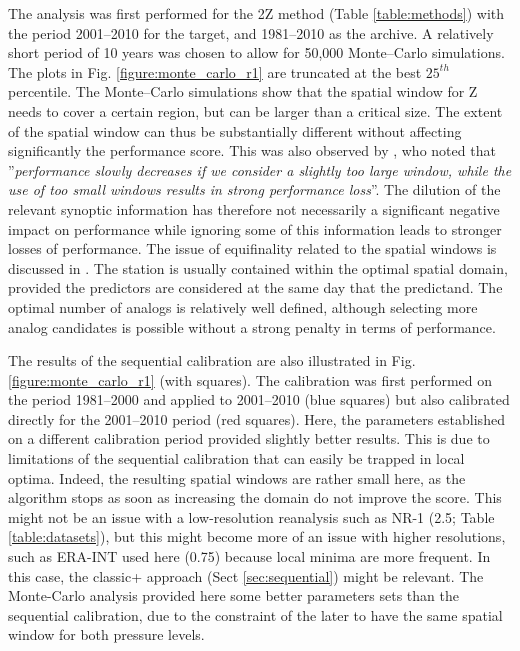 \documentclass[review]{elsarticle}
\begin{document}
The analysis was first performed for the 2Z method (Table \ref{table:methods}) with the period 2001--2010 for the target, and 1981--2010 as the archive. A relatively short period of 10 years was chosen to allow for 50,000 Monte--Carlo simulations. The plots in Fig. \ref{figure:monte_carlo_r1} are truncated at the best $25^{th}$ percentile. The Monte--Carlo simulations show that the spatial window for Z needs to cover a certain region, but can be larger than a critical size. The extent of the spatial window can thus be substantially different without affecting significantly the performance score. This was also observed by \citet{Bontron2004}, who noted that ''\textit{performance slowly decreases if we consider a slightly too large window, while the use of too small windows results in strong performance loss}''. The dilution of the relevant synoptic information has therefore not necessarily a significant negative impact on performance while ignoring some of this information leads to stronger losses of performance. The issue of equifinality related to the spatial windows is discussed in \cite{Radanovics2013}. The station is usually contained within the optimal spatial domain, provided the predictors are considered at the same day that the predictand. The optimal number of analogs is relatively well defined, although selecting more analog candidates is possible without a strong penalty in terms of performance.

The results of the sequential calibration are also illustrated in Fig. \ref{figure:monte_carlo_r1} (with squares). The calibration was first performed on the period 1981--2000 and applied to 2001--2010 (blue squares) but also calibrated directly for the 2001--2010 period (red squares). Here, the parameters established on a different calibration period provided slightly better results. This is due to limitations of the sequential calibration that can easily be trapped in local optima. Indeed, the resulting spatial windows are rather small here, as the algorithm stops as soon as increasing the domain do not improve the score. This might not be an issue with a low-resolution reanalysis such as NR-1 (2.5\degree; Table \ref{table:datasets}), but this might become more of an issue with higher resolutions, such as ERA-INT used here (0.75\degree) because local minima are more frequent. In this case, the classic+ approach (Sect \ref{sec:sequential}) might be relevant. The Monte-Carlo analysis provided here some better parameters sets than the sequential calibration, due to the constraint of the later to have the same spatial window for both pressure levels. 
\end{document}
